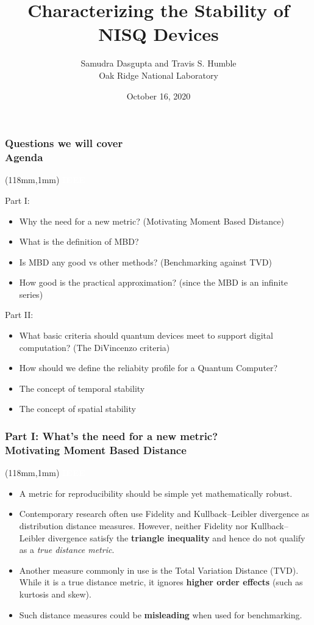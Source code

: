 \documentclass[x11names, svgnames]{beamer}
\title{\Large{Characterizing the Stability of NISQ Devices}}
\author{\small{Samudra Dasgupta and Travis S. Humble\\Oak Ridge National Laboratory}}
\date{October 16, 2020}
\begin{document}
\frame[plain]{\titlepage}

\addtocounter{framenumber}{-1}


\begin{frame}
\frametitle{Questions we will cover\\\small{Agenda}}
\begin{textblock*}{50mm}(118mm,1mm)
\scriptsize
\textcolor{white}{\textbf{IEEE}}
\end{textblock*}

\scriptsize
Part I:
\begin{itemize}
\item Why the need for a new metric? (Motivating Moment Based Distance)
\item What is the definition of MBD?
\item Is MBD any good vs other methods? (Benchmarking against TVD)
\item How good is the practical approximation? (since the MBD is an infinite series)
\end{itemize}

\vspace{4mm}
Part II:
\begin{itemize}
\item What basic criteria should quantum devices meet to support digital computation? (The DiVincenzo criteria)
\item How should we define the reliabity profile for a Quantum Computer?
\item The concept of temporal stability
\item 
The concept of spatial stability
\end{itemize}
\end{frame}

\begin{frame}
\frametitle{Part I: What's the need for a new metric?\\\small{Motivating Moment Based Distance}}
\begin{textblock*}{50mm}(118mm,1mm)
\scriptsize
\textcolor{white}{\textbf{IEEE}}
\end{textblock*}

\scriptsize
\begin{itemize}
\item A metric for reproducibility should be simple yet mathematically robust.
\item Contemporary research often use Fidelity and Kullback–Leibler divergence as distribution distance measures. However, neither Fidelity nor Kullback–Leibler divergence satisfy the \textbf{triangle inequality} and hence do not qualify as a \textit{true distance metric}.
\item Another measure commonly in use is the Total Variation Distance (TVD). While it is a true distance metric, it ignores \textbf{higher order effects} (such as kurtosis and skew).
\item Such distance measures could be \textbf{misleading} when used for benchmarking.
\end{itemize}
\end{frame}
\end{document}
